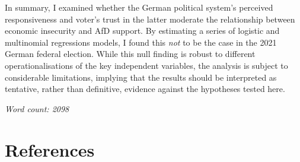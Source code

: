 \documentclass[
]{article}
\begin{document}
In summary, I examined whether the German political system's perceived
responsiveness and voter's trust in the latter moderate the relationship
between economic insecurity and AfD support. By estimating a series of
logistic and multinomial regressions models, I found this \emph{not} to
be the case in the 2021 German federal election. While this null finding
is robust to different operationalisations of the key independent
variables, the analysis is subject to considerable limitations, implying
that the results should be interpreted as tentative, rather than
definitive, evidence against the hypotheses tested here.

\emph{Word count: 2098}

\FloatBarrier

\hypertarget{references}{%
\section{References}\label{references}}
\end{document}
